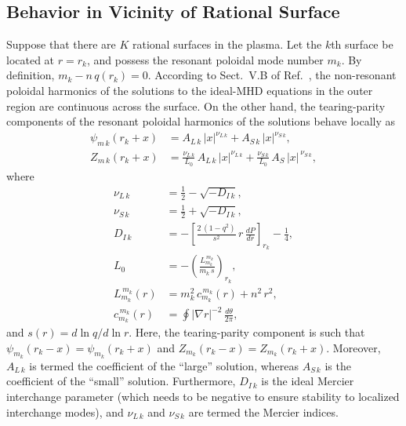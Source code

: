 \documentclass[12pt,prb,aps]{revtex4-1}
\begin{document}
\subsection{Behavior in Vicinity of Rational Surface}\label{rational}
Suppose that there are $K$ rational surfaces in the plasma. Let the $k$th surface be located at $r=r_k$, and possess the resonant poloidal
mode number $m_k$. By definition, $m_k-n\,q(r_k)=0$. 
According to Sect.~V.B of Ref.~,  the non-resonant poloidal harmonics of the solutions to the
ideal-MHD equations in the outer region  are continuous across the surface. On the other hand, the tearing-parity components of the resonant poloidal
harmonics of the solutions behave locally as
\begin{align}
\psi_{m\,k}(r_k+x) &= A_{L\,k}\,|x|^{\nu_{L\,k}} + A_{S\,k}\,|x|^{\nu_{S\,k}},\\[0.5ex]
Z_{m\,k}(r_k+x)&= \frac{\nu_{L\,k}}{L_0}\,A_{L\,k}\,|x|^{\nu_{L\,k}}+ \frac{\nu_{S\,k}}{L_0}\,A_S\,|x|^{\,\nu_{S\,k}},
\end{align}
where
\begin{align}
\nu_{L\,k} &= \frac{1}{2}-\sqrt{-D_{I\,k}},\\[0.5ex]
\nu_{S\,k} &= \frac{1}{2}+\sqrt{-D_{I\,k}},\\[0.5ex]
D_{I\,k}&= - \left[\frac{2\,(1-q^2)}{s^2}\,r\,\frac{dP}{dr}\right]_{r_k} -\frac{1}{4},\label{di}\\[0.5ex]
L_0 &= -\left(\frac{L_{m_k}^{\,m_k}}{m_k\,s}\right)_{r_k},\\[0.5ex]
L_{m_k}^{\,m_k}(r) &= m_k^2\,c_{m_k}^{\,m_k}(r) + n^2\,r^2,\\[0.5ex]
c_{m_k}^{\,m_k}(r) &=\oint|\nabla r|^{-2}\,\frac{d\theta}{2\pi},
\end{align}
and $s(r)= d\ln q/d\ln r$. Here, the tearing-parity component is such that $\psi_{m_k}(r_k-x)=\psi_{m_k}(r_k+x)$ and $Z_{m_k}(r_k-x)=Z_{m_k}(r_k+x)$. 
Moreover, $A_{L\,k}$ is termed the coefficient of the ``large'' solution, whereas $A_{S\,k}$ is the coefficient of the ``small'' solution. Furthermore, $D_{I\,k}$ is the ideal
Mercier interchange parameter (which needs to be negative to ensure stability to localized interchange modes),\cite{mercier,ggj,ggj1} and $\nu_{L\,k}$ and $\nu_{S\,k}$
are termed the Mercier indices. 
\end{document}
